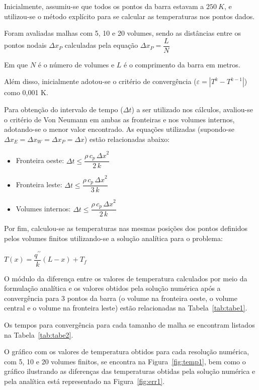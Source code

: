     Inicialmente, assumiu-se que todos os pontos da barra estavam a $250~K$, e utilizou-se o método explícito para se calcular as temperaturas nos pontos dados.

    Foram avaliadas malhas com 5, 10 e 20 volumes, sendo as distâncias entre os pontos nodais $\Delta x_{P}$ calculadas pela equação $\Delta x_{P} = \dfrac{L}{N}$

    Em que $N$ é o número de volumes e $L$ é o comprimento da barra em metros.

    Além disso, inicialmente adotou-se o critério de convergência ($\varepsilon = |T^{k}-T^{k-1}|$) como 0,001 K.

    Para obtenção do intervalo de tempo ($\Delta t$) a ser utilizado nos cálculos, avaliou-se o critério de Von Neumann em ambas as fronteiras e nos volumes internos, adotando-se o menor valor encontrado. As equações utilizadas (supondo-se $\Delta x_{E} = \Delta x_{W} = \Delta x_{P} = \Delta x$) estão relacionadas abaixo:

    \begin{itemize}
        \item [-]Fronteira oeste: $\Delta t \le\dfrac{\rho\,c_{p}\,{\Delta x}^2}{2\,k}$
        \item [-]Fronteira leste: $\Delta t \le\dfrac{\rho\,c_{p}\,{\Delta x}^2}{3\,k}$
        \item [-]Volumes internos: $\Delta t \le\dfrac{\rho\,c_{p}\,{\Delta x}^2}{2\,k}$
    \end{itemize}

    Por fim, calculou-se as temperaturas nas mesmas posições dos pontos definidos pelos volumes finitos utilizando-se a solução analítica para o problema:

    \begin{center}
        $T(x) = \dfrac{q^{\prime\prime}}{k}(L-x)+T_{f}$
    \end{center}

    O módulo da diferença entre os valores de temperatura calculados por meio da formulação analítica e os valores obtidos pela solução numérica após a convergência para 3 pontos da barra (o volume na fronteira oeste, o volume central e o volume na fronteira leste) estão relacionadas na Tabela~\ref{tab:tabe1}.

    Os tempos para convergência para cada tamanho de malha se encontram listados na Tabela~\ref{tab:tabe2}.

    O gráfico com os valores de temperatura obtidos para cada resolução numérica, com 5, 10 e 20 volumes finitos, se encontra na Figura~\ref{fig:temp1}, bem como o gráfico ilustrando as diferenças das temperaturas obtidas pela solução numérica e pela analítica está representado na Figura~\ref{fig:err1}.

